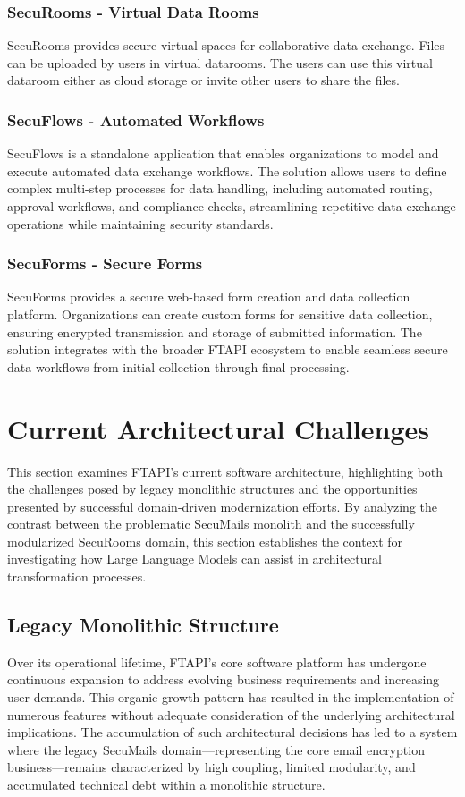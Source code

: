 \subsubsection{SecuRooms - Virtual Data Rooms}\label{sec:securooms}
SecuRooms provides secure virtual spaces for collaborative data exchange. Files can be uploaded by users in virtual datarooms. The users can use this virtual dataroom either as cloud storage or invite other users to share the files. 

\subsubsection{SecuFlows - Automated Workflows}
SecuFlows is a standalone application that enables organizations to model and execute automated data exchange workflows. The solution allows users to define complex multi-step processes for data handling, including automated routing, approval workflows, and compliance checks, streamlining repetitive data exchange operations while maintaining security standards.

\subsubsection{SecuForms - Secure Forms}
SecuForms provides a secure web-based form creation and data collection platform. Organizations can create custom forms for sensitive data collection, ensuring encrypted transmission and storage of submitted information. The solution integrates with the broader FTAPI ecosystem to enable seamless secure data workflows from initial collection through final processing.

\section{Current Architectural Challenges}

This section examines FTAPI's current software architecture, highlighting both the challenges posed by legacy monolithic structures and the opportunities presented by successful domain-driven modernization efforts. By analyzing the contrast between the problematic SecuMails monolith and the successfully modularized SecuRooms domain, this section establishes the context for investigating how Large Language Models can assist in architectural transformation processes.

\subsection{Legacy Monolithic Structure}
Over its operational lifetime, FTAPI's core software platform has undergone continuous expansion to address evolving business requirements and increasing user demands. This organic growth pattern has resulted in the implementation of numerous features without adequate consideration of the underlying architectural implications. The accumulation of such architectural decisions has led to a system where the legacy SecuMails domain—representing the core email encryption business—remains characterized by high coupling, limited modularity, and accumulated technical debt within a monolithic structure.

